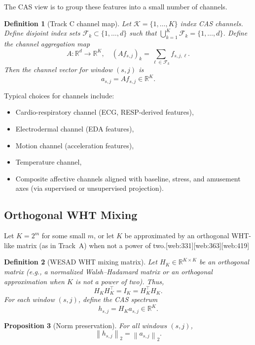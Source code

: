 \documentclass[11pt]{article}
\newtheorem{definition}{Definition}[section]
\newtheorem{proposition}[definition]{Proposition}
\newcommand{\R}{\mathbb{R}}
\newcommand{\norm}[1]{\left\lVert #1 \right\rVert}
\begin{document}
The CAS view is to group these features into a small number of channels.

\begin{definition}[Track C channel map]
Let \(\mathcal{K} = \{1,\dots,K\}\) index CAS channels.
Define disjoint index sets \(\mathcal{F}_k \subset \{1,\dots,d\}\) such that \(\bigcup_{k=1}^K \mathcal{F}_k = \{1,\dots,d\}\).
Define the channel aggregation map
\[
  A : \R^d \to \R^K, \quad
  (A f_{s,j})_k = \sum_{\ell \in \mathcal{F}_k} f_{s,j,\ell}.
\]
Then the channel vector for window \((s,j)\) is
\[
  a_{s,j} = A f_{s,j} \in \R^K.
\]
\end{definition}

Typical choices for channels include:

\begin{itemize}
  \item Cardio-respiratory channel (ECG, RESP-derived features),
  \item Electrodermal channel (EDA features),
  \item Motion channel (acceleration features),
  \item Temperature channel,
  \item Composite affective channels aligned with baseline, stress, and amusement axes (via supervised or unsupervised projection).
\end{itemize}

\subsection{Orthogonal WHT Mixing}

Let \(K = 2^m\) for some small \(m\), or let \(K\) be approximated by an orthogonal WHT-like matrix (as in Track~A) when not a power of two.\cite{WHTOverview,WHTOrthogonal}[web:331][web:363][web:419]

\begin{definition}[WESAD WHT mixing matrix]
Let \(H_K \in \R^{K \times K}\) be an orthogonal matrix (e.g., a normalized Walsh--Hadamard matrix or an orthogonal approximation when \(K\) is not a power of two).
Thus,
\[
  H_K H_K^\top = I_K = H_K^\top H_K.
\]
For each window \((s,j)\), define the CAS spectrum
\[
  h_{s,j} = H_K a_{s,j} \in \R^K.
\]
\end{definition}

\begin{proposition}[Norm preservation]
For all windows \((s,j)\),
\[
  \norm{h_{s,j}}_2 = \norm{a_{s,j}}_2.
\]
\end{proposition}
\end{document}
